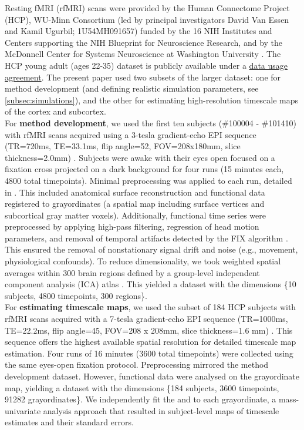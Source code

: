 \documentclass[main.tex]{subfiles}
\begin{document}
Resting fMRI (rfMRI) scans were provided by the Human Connectome Project (HCP), WU-Minn Consortium (led by principal investigators David Van Essen and Kamil Ugurbil; 1U54MH091657) funded by the 16 NIH Institutes and Centers supporting the NIH Blueprint for Neuroscience Research, and by the McDonnell Center for Systems Neuroscience at Washington University \cite{van_essen_wu-minn_2013}. The HCP young adult (ages 22-35) dataset is publicly available under a \href{https://www.humanconnectome.org/storage/app/media/data_use_terms/DataUseTerms-HCP-Open-Access-26Apr2013.pdf}{data usage agreement}. The present paper used two subsets of the larger dataset: one for method development (and defining realistic simulation parameters, see \ref{subsec:simulations}), and the other for estimating high-resolution timescale maps of the cortex and subcortex.\\

For \textbf{method development}, we used the first ten subjects (\#100004 - \#101410) with rfMRI scans acquired using a 3-tesla gradient-echo EPI sequence (TR=720ms, TE=33.1ms, flip angle=52\textdegree, FOV=208x180mm, slice thickness=2.0mm) \cite{van_essen_wu-minn_2013}. Subjects were awake with their eyes open focused on a fixation cross projected on a dark background for four runs (15 minutes each, 4800 total timepoints). Minimal preprocessing was applied to each run, detailed in \cite{glasser_minimal_2013}. This included anatomical surface reconstruction \cite{robinson_msm_2014} and functional data registered to grayordinates (a spatial map including surface vertices and subcortical gray matter voxels). Additionally, functional time series were preprocessed by applying high-pass filtering, regression of head motion parameters, and removal of temporal artifacts detected by the FIX algorithm \cite{salimi-khorshidi_automatic_2014}. This ensured the removal of nonstationary signal drift and noise (e.g., movement, physiological confounds). To reduce dimensionality, we took weighted spatial averages within 300 brain regions defined by a group-level independent component analysis (ICA) atlas \cite{smith_resting-state_2013}. This yielded a dataset with the dimensions \{10 subjects, 4800 timepoints, 300 regions\}.\\

For \textbf{estimating timescale maps}, we used the subset of 184 HCP subjects with rfMRI scans acquired with a 7-tesla gradient-echo EPI sequence (TR=1000ms, TE=22.2ms, flip angle=45\textdegree, FOV=208 x 208mm, slice thickness=1.6 mm) \cite{van_essen_wu-minn_2013, moeller_multiband_2010}. This sequence offers the highest available spatial resolution for detailed timescale map estimation. Four runs of 16 minutes (3600 total timepoints) were collected using the same eyes-open fixation protocol. Preprocessing mirrored the method development dataset. However, functional data were analysed on the grayordinate map, yielding a dataset with the dimensions \{184 subjects, 3600 timepoints, 91282 grayordinates\}. We independently fit the  and  to each grayordinate, a mass-univariate analysis approach that resulted in subject-level maps of timescale estimates and their standard errors.
\end{document}
